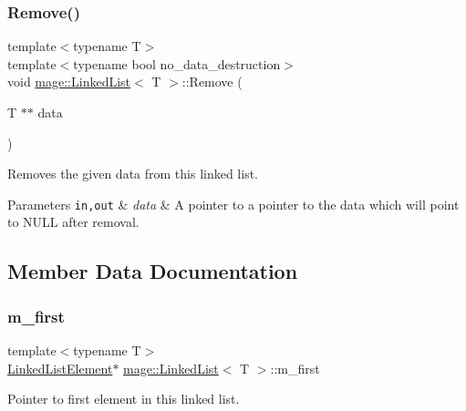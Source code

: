 \subsubsection{\texorpdfstring{Remove()}{Remove()}}
{\footnotesize\ttfamily template$<$typename T$>$ \\
template$<$typename bool no\+\_\+data\+\_\+destruction$>$ \\
void \hyperlink{classmage_1_1_linked_list}{mage\+::\+Linked\+List}$<$ T $>$\+::Remove (\begin{DoxyParamCaption}\item[{T $\ast$$\ast$}]{data }\end{DoxyParamCaption})}

Removes the given data from this linked list.


\begin{DoxyParams}[1]{Parameters}
\mbox{\tt in,out}  & {\em data} & A pointer to a pointer to the data which will point to {\ttfamily N\+U\+LL} after removal. \\
\hline
\end{DoxyParams}


\subsection{Member Data Documentation}
\hypertarget{classmage_1_1_linked_list_a194ecd23a82c83e2735717b32073340c}{}\label{classmage_1_1_linked_list_a194ecd23a82c83e2735717b32073340c} 
\subsubsection{\texorpdfstring{m\+\_\+first}{m\_first}}
{\footnotesize\ttfamily template$<$typename T$>$ \\
\hyperlink{structmage_1_1_linked_list_1_1_linked_list_element}{Linked\+List\+Element}$\ast$ \hyperlink{classmage_1_1_linked_list}{mage\+::\+Linked\+List}$<$ T $>$\+::m\+\_\+first\hspace{0.3cm}{\ttfamily [private]}}

Pointer to first element in this linked list. \hypertarget{classmage_1_1_linked_list_acb461a96b93fa3917b7ed2e30fe67fce}{}\label{classmage_1_1_linked_list_acb461a96b93fa3917b7ed2e30fe67fce} 
